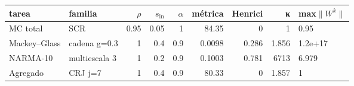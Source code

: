 \begin{tabular}{llrrrrrrl}
\toprule
tarea & familia & $\rho$ & $s_{\mathrm{in}}$ & $\alpha$ & métrica & Henrici & κ & max$\|W^k\|$ \\
\midrule
MC total & SCR & 0.95 & 0.05 & 1 & 84.35 & 0 & 1 & 0.95 \\
Mackey–Glass & cadena g=0.3 & 1 & 0.4 & 0.9 & 0.0098 & 0.286 & 1.856 & 1.2e+17 \\
NARMA-10 & multiescala 3 & 1 & 0.2 & 0.9 & 0.1003 & 0.781 & 6713 & 6.979 \\
Agregado & CRJ j=7 & 1 & 0.4 & 0.9 & 80.33 & 0 & 1.857 & 1 \\
\bottomrule
\end{tabular}
